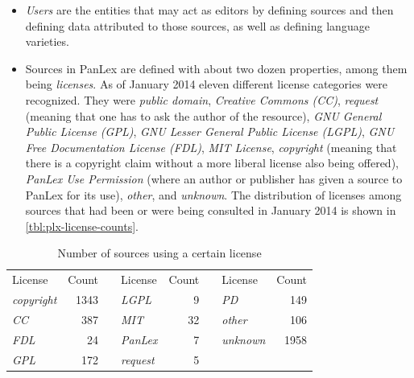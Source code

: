 \documentclass[sw]{iosart2c}
\begin{document}
\begin{itemize}
  \item \emph{Users} are the entities that may act as editors by defining sources and then defining data attributed to those sources, as well as defining language varieties.
  \item Sources in PanLex are defined with about two dozen properties, among them being \emph{licenses}. As of January 2014 eleven different license categories were recognized. They were \emph{public domain}, \emph{Creative Commons (CC)}, \emph{request} (meaning that one has to ask the author of the resource), \emph{GNU General Public License (GPL)}, \emph{GNU Lesser General Public License (LGPL)}, \emph{GNU Free Documentation License (FDL)}, \emph{MIT License}, \emph{copyright} (meaning that there is a copyright claim without a more liberal license also being offered), \emph{PanLex Use Permission} (where an author or publisher has given a source to PanLex for its use), \emph{other}, and \emph{unknown}.
    The distribution of licenses among sources that had been or were being consulted in January 2014 is shown in \autoref{tbl:plx-license-counts}.
\end{itemize}

\begin{table}
\centering
\begin{scriptsize}
\begin{tabular}{lrclrclr}
License          & Count &&
License          & Count &&
License          & Count \\
\cline{1-2} \cline{4-5} \cline{7-8}
\emph{copyright} &  1343  && \emph{LGPL}      &     9 && \emph{PD}           & 149 \\
\emph{CC}          &   387   && \emph{MIT}         &    32 && \emph{other}       &   106 \\
\emph{FDL}        &    24    && \emph{PanLex}    &    7 && \emph{unknown}  &  1958 \\
\emph{GPL}        &   172   && \emph{request}    &     5 \\
\end{tabular}
\end{scriptsize}
\caption{Number of sources using a certain license}
\label{tbl:plx-license-counts}
\end{table}
\end{document}

